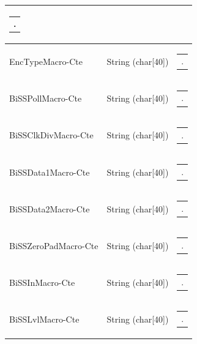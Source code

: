 \documentclass[openany]{article}
\begin{document}
\begin{longtable}{| m{4.5cm} m{2.5cm}  m{8.5cm} |}
\begin{tabular}{@{}m{6cm}@{}}
                .
            \end{tabular} \hypertarget{pv:enc-type-macro-cte}{}\\ \hline
        EncTypeMacro-Cte & String (char[40]) & \begin{tabular}{@{}m{6cm}@{}}
                .
            \end{tabular} \hypertarget{pv:biss-poll-macro-cte}{}\\ \hline
        BiSSPollMacro-Cte & String (char[40]) & \begin{tabular}{@{}m{6cm}@{}}
                .
            \end{tabular} \hypertarget{pv:biss-clk-div-macro-cte}{}\\ \hline
        BiSSClkDivMacro-Cte & String (char[40]) & \begin{tabular}{@{}m{6cm}@{}}
                .
            \end{tabular} \hypertarget{pv:biss-data-1--macro-cte}{}\\ \hline
        BiSSData1Macro-Cte & String (char[40]) & \begin{tabular}{@{}m{6cm}@{}}
                .
            \end{tabular} \hypertarget{pv:biss-data-2-macro-cte}{}\\ \hline
        BiSSData2Macro-Cte & String (char[40]) & \begin{tabular}{@{}m{6cm}@{}}
                .
            \end{tabular} \hypertarget{pv:biss-zero-pad-macro-cte}{}\\ \hline
        BiSSZeroPadMacro-Cte & String (char[40]) & \begin{tabular}{@{}m{6cm}@{}}
                .
            \end{tabular} \hypertarget{pv:biss-in-macro-cte}{}\\ \hline
        BiSSInMacro-Cte & String (char[40]) & \begin{tabular}{@{}m{6cm}@{}}
                .
            \end{tabular} \hypertarget{pv:biss-lvl-macro-cte}{}\\ \hline
        BiSSLvlMacro-Cte & String (char[40]) & \begin{tabular}{@{}m{6cm}@{}}
                .
            \end{tabular} \hypertarget{}{}\\ \hline
    \end{longtable}
\end{document}
